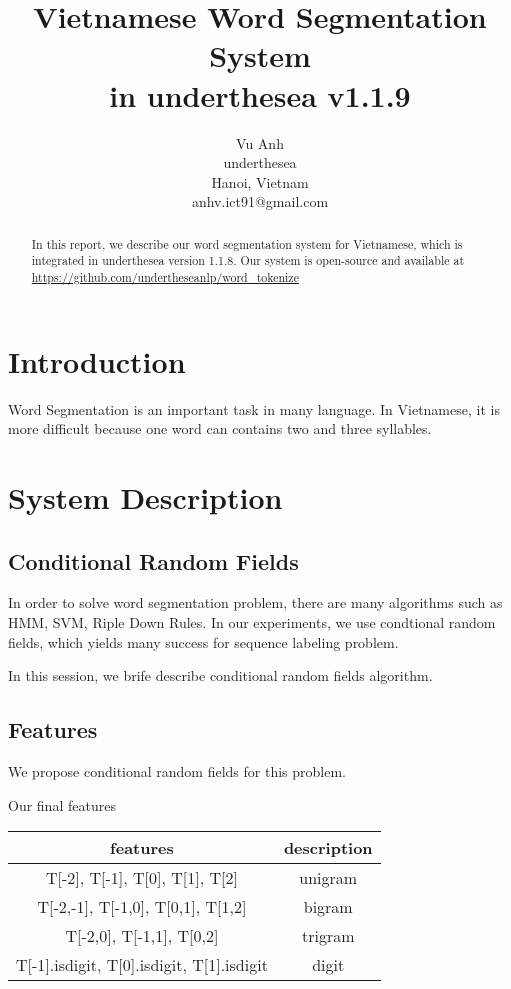 \documentclass[11pt,a4paper]{article}
\title{Vietnamese Word Segmentation System \\ in underthesea v1.1.9}
\author{
Vu Anh\\
underthesea\\
Hanoi, Vietnam\\
anhv.ict91@gmail.com
}
\date{}
\begin{document}
\maketitle
\begin{abstract}
In this report, we describe our word segmentation system for Vietnamese, which is integrated in underthesea version 1.1.8.
Our system is open-source and available at \url{https://github.com/undertheseanlp/word_tokenize}

\end{abstract}

\section{Introduction}

Word Segmentation is an important task in many language. In Vietnamese, it is more difficult because one word can contains two and three syllables.


\section{System Description}

\subsection{Conditional Random Fields}

In order to solve word segmentation problem, there are many algorithms such as HMM, SVM, Riple Down Rules. In our experiments, we use condtional random fields, which yields many success for sequence labeling problem.

In this session, we brife describe conditional random fields algorithm.


\subsection{Features}
We propose conditional random fields for this problem.

Our final features
\begin{center}
\begin{tabular}{ |c|c| }
 \hline
 features & description \\
 \hline
 T[-2], T[-1], T[0], T[1], T[2] & unigram  \\
 T[-2,-1], T[-1,0], T[0,1], T[1,2] & bigram  \\
 T[-2,0], T[-1,1], T[0,2] & trigram \\
 T[-1].isdigit, T[0].isdigit, T[1].isdigit & digit
 \hline
\end{tabular}
\end{center}
\end{document}
